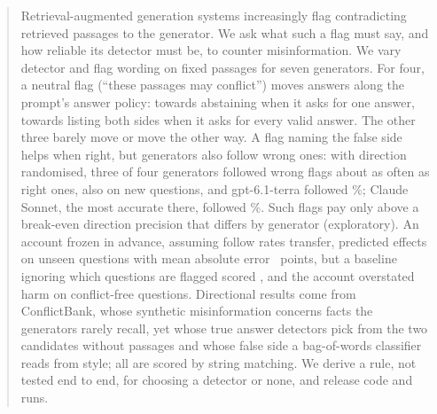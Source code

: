 \begin{abstract}
Retrieval-augmented generation systems increasingly flag contradicting retrieved passages to the generator. We ask
what such a flag must say, and how reliable its detector must be, to counter misinformation. We vary detector and
flag wording on fixed passages for seven generators. For four, a neutral flag (``these passages may conflict'') moves
answers along the prompt's answer policy: towards abstaining when it asks for one answer, towards listing both sides
when it asks for every valid answer. The other three barely move or move the other way. A flag naming the false side
helps when right, but generators also follow wrong ones: with direction randomised, three of four generators
followed wrong flags about as often as right ones, also on new questions, and gpt-6.1-terra followed
\rfolWrongTerra\%; Claude Sonnet, the most accurate there, followed \cxRdSonnetFolW\%. Such flags pay only above a
break-even direction precision that differs by generator (exploratory). An account
frozen in advance, assuming follow rates transfer, predicted effects on unseen questions with mean
absolute error \frMae\ points, but a baseline ignoring which questions are flagged scored \frMaeMarg, and the account
overstated harm on conflict-free questions. Directional results come from ConflictBank, whose synthetic
misinformation concerns facts the generators rarely recall, yet whose true answer detectors pick from the two
candidates without passages and whose false side a bag-of-words classifier reads from style; all are scored by
string matching. We derive a rule, not tested end to end, for choosing a detector or
none, and release code and runs.
\end{abstract}
